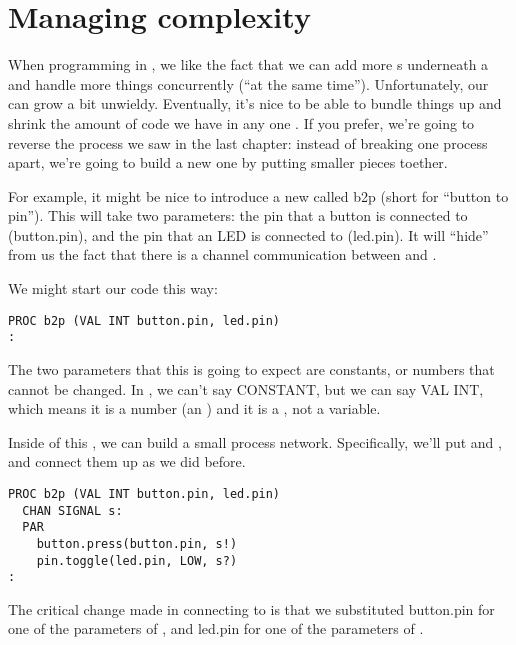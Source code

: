 \newpage

\section{Managing complexity}
When programming in \occam, we like the fact that we can add more {\PROCedure}s underneath a \PAR and handle more things concurrently (``at the same time''). Unfortunately, our \PAR can grow a bit unwieldy. Eventually, it's nice to be able to bundle things up and shrink the amount of code we have in any one \PROC. If you prefer, we're going to reverse the process we saw in the last chapter: instead of breaking one process apart, we're going to build a new one by putting smaller pieces toether.

For example, it might be nice to introduce a new \PROC called {\code b2p} (short for ``button to pin''). This \PROCedure will take two parameters: the pin that a button is connected to ({\code button.pin}), and the pin that an LED is connected to ({\code led.pin}). It will ``hide'' from us the fact that there is a channel communication between \bp and \tp. 
 
We might start our code this way:

\vspace{3mm}
\begin{lstlisting}
PROC b2p (VAL INT button.pin, led.pin)
:
\end{lstlisting}

The two parameters that this \PROCedure is going to expect are {\strong constants}, or numbers that cannot be changed. In \occam, we can't say {\code CONSTANT}, but we can say {\code VAL INT}, which means it is a number (an \INTeger) and it is a \VALue, not a variable. 

\newpage

Inside of this \PROC, we can build a small process network. Specifically, we'll put \bp and \tp, and connect them up as we did before.

\vspace{3mm}
\begin{lstlisting}
PROC b2p (VAL INT button.pin, led.pin)
  CHAN SIGNAL s:
  PAR
    button.press(button.pin, s!)
    pin.toggle(led.pin, LOW, s?)
:
\end{lstlisting}

The critical change made in connecting \bp to \tp  is that we substituted {\code button.pin} for one of the parameters of \bp, and {\code led.pin} for one of the parameters of \tp. 

